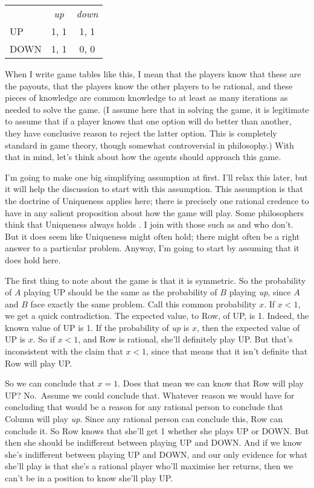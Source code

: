 \documentclass[11pt,]{book}
\def\toprule{}
\def\bottomrule{}
\begin{document}
\begin{longtable}[]{@{}lcc@{}}
\toprule
\endhead
& \emph{up} & \emph{down}\tabularnewline
UP & 1, 1 & 1, 1\tabularnewline
DOWN & 1, 1 & 0, 0\tabularnewline
\bottomrule
\end{longtable}

When I write game tables like this, I mean that the players know that these are the payouts, that the players know the other players to be rational, and these pieces of knowledge are common knowledge to at least as many iterations as needed to solve the game. (I assume here that in solving the game, it is legitimate to assume that if a player knows that one option will do better than another, they have conclusive reason to reject the latter option. This is completely standard in game theory, though somewhat controversial in philosophy.) With that in mind, let's think about how the agents should approach this game.

I'm going to make one big simplifying assumption at first. I'll relax this later, but it will help the discussion to start with this assumption. This assumption is that the doctrine of Uniqueness applies here; there is precisely one rational credence to have in any salient proposition about how the game will play. Some philosophers think that Uniqueness always holds \citep{White2005-WHIEP}. I join with those such as \citet{North2010} and \citet{Schoenfield2013} who don't. But it does seem like Uniqueness might often hold; there might often be a right answer to a particular problem. Anyway, I'm going to start by assuming that it does hold here.

The first thing to note about the game is that it is symmetric. So the probability of \(A\) playing UP should be the same as the probability of \(B\) playing \emph{up}, since \(A\) and \(B\) face exactly the same problem. Call this common probability \(x\). If \(x < 1\), we get a quick contradiction. The expected value, to Row, of UP, is 1. Indeed, the known value of UP is 1. If the probability of \emph{up} is \(x\), then the expected value of UP is \(x\). So if \(x < 1\), and Row is rational, she'll definitely play UP. But that's inconsistent with the claim that \(x < 1\), since that means that it isn't definite that Row will play UP.

So we can conclude that \(x = 1\). Does that mean we can know that Row will play UP? No.~Assume we could conclude that. Whatever reason we would have for concluding that would be a reason for any rational person to conclude that Column will play \emph{up}. Since any rational person can conclude this, Row can conclude it. So Row knows that she'll get 1 whether she plays UP or DOWN. But then she should be indifferent between playing UP and DOWN. And if we know she's indifferent between playing UP and DOWN, and our only evidence for what she'll play is that she's a rational player who'll maximise her returns, then we can't be in a position to know she'll play UP.
\end{document}
